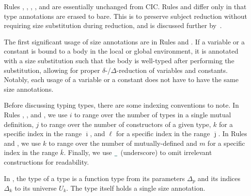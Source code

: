 Rules , , ,  , and  are essentially unchanged from CIC.
Rules  and  differ only in that type annotations are erased to bare.
This is to preserve subject reduction without requiring size substitution during reduction, and is discussed further by~\citet{cic-hat-minus}.

The first significant usage of size annotations are in Rules  and .
If a variable or a constant is bound to a body in the local or global environment, it is annotated with a size substitution such that the body is well-typed after performing the substitution, allowing for proper $\delta$-/$\Delta$-reduction of variables and constants.
Notably, each usage of a variable or a constant does not have to have the same size annotations.

Before discussing typing \coinductive types, there are some indexing conventions to note.
In Rules , , and , we use $i$ to range over the number of \coinductive types in a single mutual \coinductive definition, $j$ to range over the number of constructors of a given \coinductive type, $k$ for a specific index in the range $\overline{\imath}$, and $\ell$ for a specific index in the range $\overline{\jmath}$.
In Rules  and , we use $k$ to range over the number of mutually-defined \cofixpoints and $m$ for a specific index in the range $\overline{k}$.
Finally, we use $\any$ (underscore) to omit irrelevant constructions for readability.

In , the type of a \coinductive type is a function type from its parameters $\Delta_p$ and its indices $\Delta_k$ to its universe $U_k$.
The \coinductive type itself holds a single size annotation.

